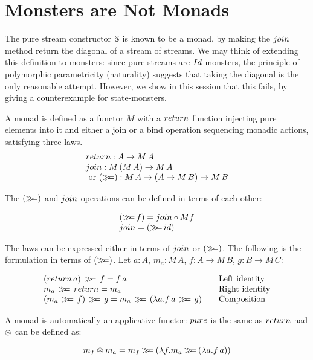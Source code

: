 \section{Monsters are Not Monads}\label{sec:monad}

The pure stream constructor $\mathbb{S}$ is known to be a monad, by making the $\join$ method return the diagonal of a stream of streams.
We may think of extending this definition to monsters: since pure streams are $\Id$-monsters, the principle of polymorphic parametricity (naturality) suggests that taking the diagonal is the only reasonable attempt.
However, we show in this session that this fails, by giving a counterexample for state-monsters.

A monad is defined as a functor $M$ with a $\return$ function injecting pure elements into it and either a join or a bind operation sequencing monadic actions, satisfying three laws.
$$
\begin{array}{l}
\return : A \rightarrow M\, A \\
\join : M\,(M\, A) \rightarrow M\, A\\
\mbox{ or }
(\bind) : M\, A \rightarrow (A \rightarrow M\, B) \rightarrow M\, B
\end{array}
$$

The $(\mathbin{\gg\!\!=})$ and $\join$ operations can be defined in terms of each other:

$$
\begin{array}{l}
(\bind\, f) = \join \comp M f \\
\join = (\bind\,\id)
\end{array}
$$

The laws can be expressed either in terms of $\join$ or $(\mathbin{\gg\!\!=})$.
The following is the formulation in terms of $(\mathbin{\gg\!\!=})$.
Let $a:A$, $m_a : M\, A$,
$f : A \rightarrow M\, B$, $g : B \rightarrow M\,C$:

$$
\begin{array}{l@{\qquad}l}
(\return\, a)\, \bind \, f = f\, a
  & \mbox{Left identity} \\
m_a\, \bind \, \return = m_a
  & \mbox{Right identity} \\
(m_a \, \bind \, f)\, \bind \, g = m_a\, \bind\, (\lambda a.  f\, a \, \bind \, g)
  & \mbox{Composition} \\
\end{array}
$$

A monad is automatically an applicative functor:
$\apure$ is the same as $\return$ nad $\circledast$ can be defined as:

$$
m_f\circledast m_a = m_f \mathbin{\gg\!\!=} (\lambda f. m_a \mathbin{\gg\!\!=} (\lambda a. f\,a))
$$

